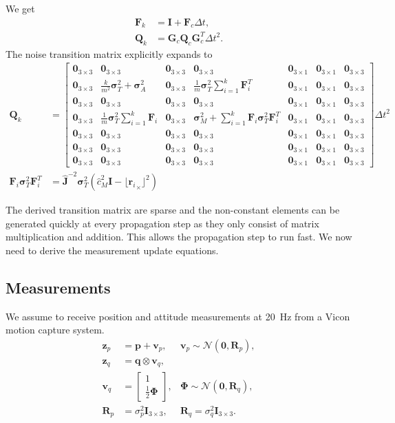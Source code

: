 \documentclass[10pt,a4paper]{article}
\newcommand{\skewsym}[1]{\lfloor #1 _\times \rfloor}
\newcommand{\kmomh}{\hat{c}_M}
\newcommand{\Inertia}{\mathbf{J}}
\newcommand{\zthree}{\mathbf{0}_{3\times3}}
\newcommand{\zthreeone}{\mathbf{0}_{3\times1}}
\newcommand{\identity}{\mathbf{I}_{3\times3}}
\newcommand{\sigmat}{\boldsymbol{\sigma}_T}
\newcommand{\sigmaa}{\boldsymbol{\sigma}_A}
\newcommand{\sigmam}{\boldsymbol{\sigma}_M}
\begin{document}
We get
\begin{align}
\mathbf{F}_k &= \mathbf{I} + \mathbf{F}_c \Delta t, \label{eq:system_discrete}\\
\mathbf{Q}_k &= \mathbf{G}_c \mathbf{Q}_c \mathbf{G}_c^T \Delta t ^2 \label{eq:system_noise_discrete}.
\end{align}
The noise transition matrix explicitly expands to
\begin{align}
\mathbf{Q}_k &= \begin{bmatrix}
\zthree & \zthree & \zthree & \zthree & \zthreeone & \zthreeone & \zthree \\
\zthree & \frac{k}{m^2} \sigmat^2 + \sigmaa^2 & \zthree & \frac{1}{m} \sigmat^2 \sum_{i=1}^k \mathbf{F}_i^T & \zthreeone & \zthreeone & \zthree \\
\zthree & \zthree & \zthree & \zthree & \zthreeone & \zthreeone & \zthree \\
\zthree & \frac{1}{m} \sigmat^2 \sum_{i=1}^k \mathbf{F}_i & \zthree & \sigmam^2 + \sum_{i=1}^k \mathbf{F}_i \sigmat^2 \mathbf{F}_i^T & \zthreeone & \zthreeone & \zthree \\
\zthree & \zthree & \zthree & \zthree & \zthreeone & \zthreeone & \zthree \\
\zthree & \zthree & \zthree & \zthree & \zthreeone & \zthreeone & \zthree \\
\zthree & \zthree & \zthree & \zthree & \zthreeone & \zthreeone & \zthree 
\end{bmatrix} \Delta t^2  \label{eq:system_noise_discrete_explicit}\\
\mathbf{F}_i \sigmat^2 \mathbf{F}_i^T &= \hat{\Inertia}^{-2} \sigmat^2 \left( \kmomh^2 \mathbf{I} - \skewsym{{\mathbf{r}_i}}^2 \right) 
\end{align}

The derived transition matrix are sparse and the non-constant elements can be generated quickly at every propagation step as they only consist of matrix multiplication and addition. This allows the propagation step to run fast. We now need to derive the measurement update equations.

\subsection*{Measurements}
We assume to receive position and attitude measurements at \SI{20}{\hertz} from a Vicon motion capture system. 
\begin{align}
\mathbf{z}_p &= \mathbf{p} + \mathbf{v}_p, & \boldsymbol{v}_p \sim \mathbf{\mathcal{N}} \left( \mathbf{0}, \mathbf{R}_p \right),\\
\mathbf{z}_q &= \mathbf{q} \otimes \mathbf{v}_q, \\
\mathbf{v}_q &= \begin{bmatrix}
1 \\ \frac{1}{2} \boldsymbol{\Phi} 
\end{bmatrix} , & \boldsymbol{\Phi} \sim \mathbf{\mathcal{N}} \left( \mathbf{0}, \mathbf{R}_q \right), \\
\mathbf{R}_p & = \sigma_p^2 \identity, & \mathbf{R}_q = \sigma_q^2 \identity.
\end{align}
\end{document}
